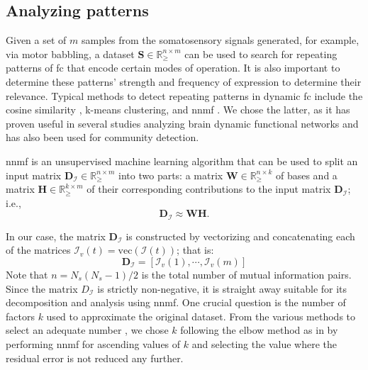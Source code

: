 \subsection{Analyzing patterns}
Given a set of $m$ samples from the somatosensory signals generated, for example, via motor babbling, a dataset $\bm{S} \in \mathbb{R}^{n \times m}_{\geq}$ can be used to search for repeating patterns of \ac{fc} that encode certain modes of operation. It is also important to determine these patterns' strength and frequency of expression to determine their relevance. Typical methods to detect repeating patterns in dynamic \ac{fc} include the cosine similarity \cite{Menon2019comparisonstaticdynamic}, k-means clustering\cite{Li2017Hightransitionfrequencies}, and  \ac{nnmf} \cite{Fu2019Nonnegativematrixfactorization}. We chose the latter, as it has proven useful in several studies analyzing brain dynamic functional networks and has also been used for community  detection\cite{Wang2011Communitydiscoveryusing,Luo2021Symmetricnonnegativematrix}.

\ac{nnmf} is an unsupervised machine learning algorithm that can be used to split an input matrix $\bm{D}_{\bm{\mathcal{I}}} \in \mathbb{R}^{n\times m}_{\geq}$ into two parts: a matrix $\bm{W} \in \mathbb{R}^{n\times k}_{\geq}$ of bases and a matrix $\bm{H} \in \mathbb{R}^{k\times m}_{\geq}$ of their corresponding contributions to the input matrix $\bm{D}_{\bm{\mathcal{I}}}$; i.e.,
\begin{equation}
	\bm{D}_{\bm{\mathcal{I}}} 	\approx \bm{W} \bm{H}.
\end{equation}

In our case, the matrix $\bm{D}_{\bm{\mathcal{I}}}$ is constructed by vectorizing  and concatenating each of the matrices $\bm{\mathcal{I}}_v(t) = \text{vec}\left(\bm{\mathcal{I}}(t)\right)$; that is: 
\begin{equation}
	\bm{D}_{\bm{\mathcal{I}}} = [\bm{\mathcal{I}}_v(1),\cdots,\bm{\mathcal{I}}_v(m)]
\end{equation}
Note that $n = N_s(N_s-1)/2$ is the total number of mutual information pairs. Since the matrix $D_{\bm{\mathcal{I}}}$ is strictly non-negative, it is straight away suitable for its decomposition and analysis using \ac{nnmf}. One crucial question is the number of factors $k$ used to approximate the original dataset. From the various methods to select an adequate number \cite{Muzzarelli2019RankSelectionNon}, we chose $k$ following the elbow method as in \cite{Phalen2020Nonnegativematrix} by performing \ac{nnmf} for ascending values of $k$ and selecting the value where the residual error is not reduced any further.

